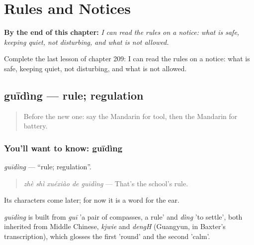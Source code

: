 
\chapter{Rules and Notices}
\label{ch:zh-rules-and-notices}

\begin{chapteropening}
\textbf{By the end of this chapter:} \emph{I can read the rules on a notice: what is safe, keeping quiet, not disturbing, and what is not allowed.}

Complete the last lesson of chapter 209: I can read the rules on a notice: what is safe, keeping quiet, not disturbing, and what is not allowed.
\end{chapteropening}

\section[guīdìng]{guīdìng — rule; regulation}

\label{lesson:ZH-C209-guiding}



\begin{quote}
Before the new one: say the Mandarin for tool, then the Mandarin for battery.
\end{quote}

\subsection*{You'll want to know: guīdìng}
\emph{guīdìng} — \textquotedblleft{}rule; regulation\textquotedblright{}.

\begin{quote}
\emph{zhè shì xuéxiào de guīdìng} — That's the school's rule.
\end{quote}

Its characters come later; for now it is a word for the ear.

\begin{cousinweb}
\emph{guīdìng} is built from \emph{guī} 'a pair of compasses, a rule' and \emph{dìng} 'to settle', both inherited from Middle Chinese, \emph{kjwie} and \emph{dengH} (Guangyun, in Baxter's transcription), which glosses the first 'round' and the second 'calm'.
\end{cousinweb}

